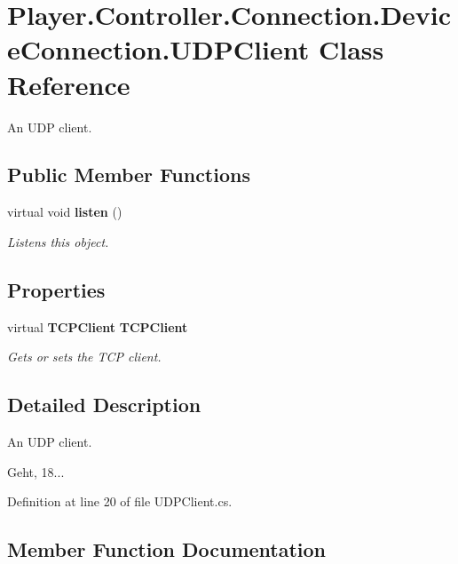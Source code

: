 \section{Player.\-Controller.\-Connection.\-Device\-Connection.\-U\-D\-P\-Client Class Reference}
\label{class_player_1_1_controller_1_1_connection_1_1_device_connection_1_1_u_d_p_client}


An U\-D\-P client.  


\subsection*{Public Member Functions}
\begin{DoxyCompactItemize}
\item 
virtual void {\bf listen} ()
\begin{DoxyCompactList}\small\item\em Listens this object. \end{DoxyCompactList}\end{DoxyCompactItemize}
\subsection*{Properties}
\begin{DoxyCompactItemize}
\item 
virtual {\bf T\-C\-P\-Client} {\bf T\-C\-P\-Client}\hspace{0.3cm}{\ttfamily  [get, set]}
\begin{DoxyCompactList}\small\item\em Gets or sets the T\-C\-P client. \end{DoxyCompactList}\end{DoxyCompactItemize}


\subsection{Detailed Description}
An U\-D\-P client. 

Geht, 18... 

Definition at line 20 of file U\-D\-P\-Client.\-cs.



\subsection{Member Function Documentation}

